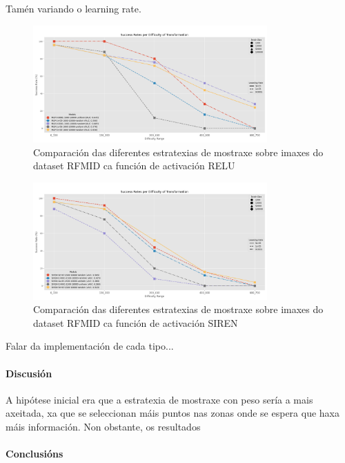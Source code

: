 Tamén variando o learning rate.

\begin{figure}[ht]
    \centering
    \includegraphics[width=0.8\textwidth]{imaxes/experiment_plot_RFMID_MLP_RvsU.png}
    \caption{Comparación das diferentes estratexias de mostraxe sobre imaxes do dataset RFMID ca función de activación RELU}
    \label{fig:sampling_comparison_relu}
\end{figure}

\begin{figure}[ht]
    \centering
    \includegraphics[width=0.8\textwidth]{imaxes/experiment_plot_RFMID_SIREN_RvsU.png}
    \caption{Comparación das diferentes estratexias de mostraxe sobre imaxes do dataset RFMID ca función de activación SIREN}
    \label{fig:sampling_comparison_SIREN}
\end{figure}

Falar da implementación de cada tipo...


\paragraph{Discusión}
\label{par:Discusión}

A hipótese inicial era que a estratexia de mostraxe con peso sería a mais axeitada, xa que se seleccionan máis puntos nas zonas onde se espera que haxa máis información.
Non obstante, os resultados 

\paragraph{Conclusións}
\label{par:Conclusións}


